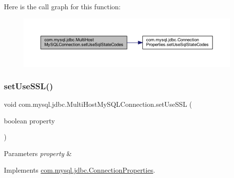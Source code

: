 Here is the call graph for this function\+:
\nopagebreak
\begin{figure}[H]
\begin{center}
\leavevmode
\includegraphics[width=350pt]{classcom_1_1mysql_1_1jdbc_1_1_multi_host_my_s_q_l_connection_a71f99bc9ca78dfeaa258b42946f7f2fd_cgraph}
\end{center}
\end{figure}
\mbox{\label{classcom_1_1mysql_1_1jdbc_1_1_multi_host_my_s_q_l_connection_ae199aca42e23e5ce684e148fb051da71}} 
\subsubsection{\texorpdfstring{set\+Use\+S\+S\+L()}{setUseSSL()}}
{\footnotesize\ttfamily void com.\+mysql.\+jdbc.\+Multi\+Host\+My\+S\+Q\+L\+Connection.\+set\+Use\+S\+SL (\begin{DoxyParamCaption}\item[{boolean}]{property }\end{DoxyParamCaption})}


\begin{DoxyParams}{Parameters}
{\em property} & \\
\hline
\end{DoxyParams}


Implements \mbox{\hyperlink{interfacecom_1_1mysql_1_1jdbc_1_1_connection_properties_a34adc2d834bd1ce90f8c8e65498906bd}{com.\+mysql.\+jdbc.\+Connection\+Properties}}.


